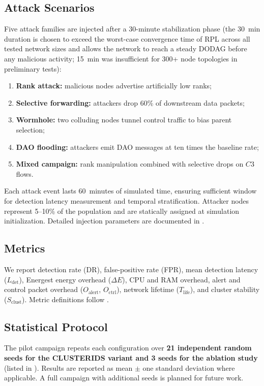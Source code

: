 \subsection{Attack Scenarios}
Five attack families are injected after a 30-minute stabilization phase (the 30~min duration is chosen to exceed the worst-case convergence time of RPL across all tested network sizes and allows the network to reach a steady DODAG before any malicious activity; 15~min was insufficient for 300+ node topologies in preliminary tests):
\begin{enumerate}
  \item \textbf{Rank attack:} malicious nodes advertise artificially low ranks;
  \item \textbf{Selective forwarding:} attackers drop 60\% of downstream data packets;
  \item \textbf{Wormhole:} two colluding nodes tunnel control traffic to bias parent selection;
  \item \textbf{DAO flooding:} attackers emit DAO messages at ten times the baseline rate;
  \item \textbf{Mixed campaign:} rank manipulation combined with selective drops on $C3$ flows.
\end{enumerate}
Each attack event lasts 60~minutes of simulated time, ensuring sufficient window for detection latency measurement and temporal stratification.
Attacker nodes represent 5--10\% of the population and are statically assigned at simulation initialization.
Detailed injection parameters are documented in .

\subsection{Metrics}
We report detection rate (DR), false-positive rate (FPR), mean detection latency ($L_{\mathrm{det}}$), Energest energy overhead ($\Delta E$), CPU and RAM overhead, alert and control packet overhead ($O_{\mathrm{alert}}$, $O_{\mathrm{ctrl}}$), network lifetime ($T_{\mathrm{life}}$), and cluster stability ($S_{\mathrm{clust}}$).
Metric definitions follow .

\subsection{Statistical Protocol}
The pilot campaign repeats each configuration over \textbf{21 independent random seeds for the CLUSTERIDS variant and 3 seeds for the ablation study} (listed in ).
Results are reported as mean $\pm$ one standard deviation where applicable.
A full campaign with additional seeds is planned for future work.

